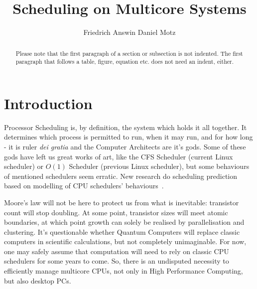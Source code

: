\documentclass[runningheads]{llncs}
\begin{document}
%
\title{Scheduling on Multicore Systems}
%
%
\author{Friedrich Answin Daniel Motz}
%
%
%
\maketitle              %
%
\begin{abstract}
Please note that the first paragraph of a section or subsection is
not indented. The first paragraph that follows a table, figure,
equation etc. does not need an indent, either.

\end{abstract}
%
%
%
\section{Introduction}
Processor Scheduling is, by definition, the system which holds it all together. It determines which
process is permitted to run, when it may run, and for how long - it is ruler \textit{dei gratia}
and the Computer Architects are it's gods. Some of these gods have left us great works of art,
like the CFS Scheduler (current Linux scheduler) or $O(1)$ Scheduler (previous Linux scheduler), 
but some behaviours of mentioned schedulers seem erratic. New research do scheduling prediction 
based on modelling of CPU schedulers' behaviours~\cite{meehean}.

Moore's law will not be here to protect us from what is inevitable: transistor count will stop
doubling. At some point, transistor sizes will meet atomic boundaries, at which point growth can
solely be realised by parallelisation and clustering. It's questionable whether Quantum Computers
will replace classic computers in scientific calculations, but not completely unimaginable. For
now, one may safely assume that computation will need to rely on classic CPU schedulers for some
years to come. So, there is an undisputed necessity to efficiently manage multicore CPUs, not only
in High Performance Computing, but also desktop PCs.~\cite{thread-sched-mc-platforms}
\end{document}
